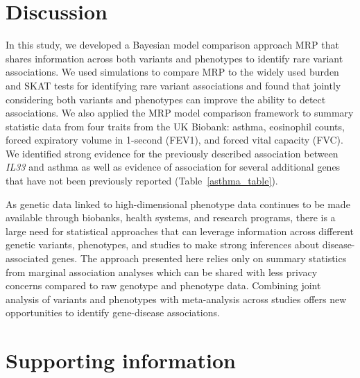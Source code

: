 \section*{Discussion}
In this study, we developed a Bayesian model comparison approach MRP that shares information across both variants and phenotypes to identify rare variant associations. We used simulations to compare MRP to the widely used burden and SKAT tests for identifying rare variant associations and found that jointly considering both variants and phenotypes can improve the ability to detect associations. We also applied the MRP model comparison framework to summary statistic data from four traits from the UK Biobank: asthma, eosinophil counts, forced expiratory volume in 1-second (FEV1), and forced vital capacity (FVC). We identified strong evidence for the previously described association between \textit{IL33} and asthma\cite{DeBoever179762, 10.1371/journal.pgen.1006659} as well as evidence of association for several additional genes that have not been previously reported (Table~\ref{asthma_table}). 

As genetic data linked to high-dimensional phenotype data continues to be made available through biobanks, health systems, and research programs, there is a large need for statistical approaches that can leverage information across different genetic variants, phenotypes, and studies to make strong inferences about disease-associated genes. The approach presented here relies only on summary statistics from marginal association analyses which can be shared with less privacy concerns compared to raw genotype and phenotype data. Combining joint analysis of variants and phenotypes with meta-analysis across studies offers new opportunities to identify gene-disease associations.



\section*{Supporting information}

